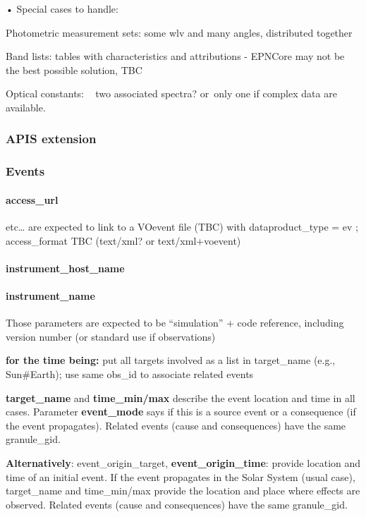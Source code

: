 \documentclass[11pt,a4paper]{ivoa}
\begin{document}
• Special cases to handle:

Photometric measurement sets: some wlv and many angles, distributed together

Band lists: tables with characteristics and attributions - EPNCore may not be the best possible solution, TBC

Optical constants: ~ two associated spectra? or only one if complex data are available.

\subsubsection{APIS extension\\}

\subsubsection{Events\\}

\paragraph{access\_url\textbf{ }}

etc… are expected to link to a VOevent file (TBC) with dataproduct\_type = ev ; access\_format TBC (text/xml? or text/xml+voevent)

\paragraph{instrument\_host\_name}

\paragraph{instrument\_name}

Those parameters are expected to be ``simulation'' + code reference, including version number (or standard use if observations)

\textbf{for the time being:} put all targets involved as a list in target\_name (e.g., Sun\#Earth); use same obs\_id to associate related events

\textbf{ target\_name }and\textbf{ time\_min/max} describe the event location and time in all cases. Parameter \textbf{event\_mode} says if this is a source event or a consequence (if the event propagates). Related events (cause and consequences) have the same granule\_gid.

\textbf{}\textbf{Alternatively}: event\_origin\_target, \textbf{event\_origin\_time}: provide location and time of an initial event. If the event propagates in the Solar System (usual case), target\_name and time\_min/max provide the location and place where effects are observed. Related events (cause and consequences) have the same granule\_gid.
\end{document}

